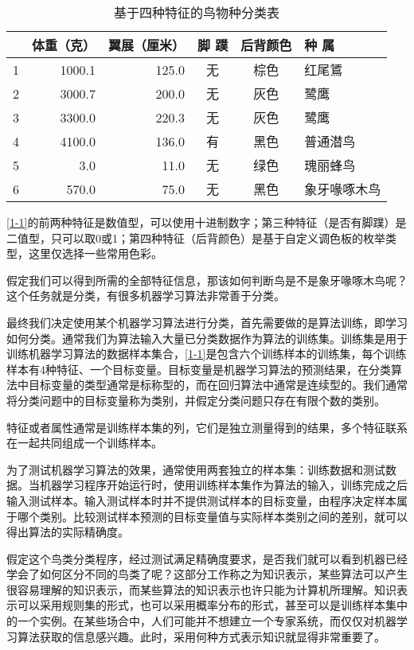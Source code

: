 \begin{table}
    \centering
    \caption{基于四种特征的鸟物种分类表}
    \label{1-1}
    \begin{tabular}{crrccl}
        \hline
          & 体重（克）  & 翼展（厘米） & 脚 蹼 & 后背颜色 & 种 属    \\
        \hline
        1 & 1000.1 & 125.0  & 无   & 棕色   & 红尾鵟    \\
        2 & 3000.7 & 200.0  & 无   & 灰色   & 鹭鹰     \\
        3 & 3300.0 & 220.3  & 无   & 灰色   & 鹭鹰     \\
        4 & 4100.0 & 136.0  & 有   & 黑色   & 普通潜鸟   \\
        5 & 3.0    & 11.0   & 无   & 绿色   & 瑰丽蜂鸟   \\
        6 & 570.0  & 75.0   & 无   & 黑色   & 象牙喙啄木鸟 \\
        \hline
    \end{tabular}
\end{table}

\autoref{1-1}的前两种特征是数值型，可以使用十进制数字；第三种特征（是否有脚蹼）是二值型，只可以取0或1；第四种特征（后背颜色）是基于自定义调色板的枚举类型，这里仅选择一些常用色彩。

假定我们可以得到所需的全部特征信息，那该如何判断鸟是不是象牙喙啄木鸟呢？这个任务就是分类，有很多机器学习算法非常善于分类。

最终我们决定使用某个机器学习算法进行分类，首先需要做的是算法训练，即学习如何分类。通常我们为算法输入大量已分类数据作为算法的训练集。训练集是用于训练机器学习算法的数据样本集合，\autoref{1-1}是包含六个训练样本的训练集，每个训练样本有4种特征、一个目标变量。目标变量是机器学习算法的预测结果，在分类算法中目标变量的类型通常是标称型的，而在回归算法中通常是连续型的。我们通常将分类问题中的目标变量称为类别，并假定分类问题只存在有限个数的类别。
\begin{tcolorbox}
    特征或者属性通常是训练样本集的列，它们是独立测量得到的结果，多个特征联系在一起共同组成一个训练样本。
\end{tcolorbox}
为了测试机器学习算法的效果，通常使用两套独立的样本集：训练数据和测试数据。当机器学习程序开始运行时，使用训练样本集作为算法的输入，训练完成之后输入测试样本。输入测试样本时并不提供测试样本的目标变量，由程序决定样本属于哪个类别。比较测试样本预测的目标变量值与实际样本类别之间的差别，就可以得出算法的实际精确度。

假定这个鸟类分类程序，经过测试满足精确度要求，是否我们就可以看到机器已经学会了如何区分不同的鸟类了呢？这部分工作称之为知识表示，某些算法可以产生很容易理解的知识表示，而某些算法的知识表示也许只能为计算机所理解。知识表示可以采用规则集的形式，也可以采用概率分布的形式，甚至可以是训练样本集中的一个实例。在某些场合中，人们可能并不想建立一个专家系统，而仅仅对机器学习算法获取的信息感兴趣。此时，采用何种方式表示知识就显得非常重要了。
